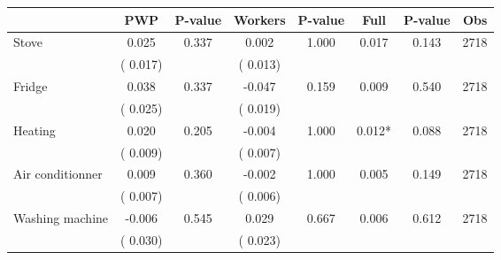 
\begin{tabular}{l*{7}{c}}\hline&\multicolumn{1}{c}{PWP}&\multicolumn{1}{c}{P-value}&\multicolumn{1}{c}{Workers}&\multicolumn{1}{c}{P-value}&\multicolumn{1}{c}{Full}&\multicolumn{1}{c}{P-value}&\multicolumn{1}{c}{Obs} \\ \hline

 Stove       &              0.025       &        0.337  &              0.002       &        1.000  &              0.017       &              0.143 &  2718 \\ 
                       &       (       0.017)             &                               &       (       0.013)                     &                               &                                               &                                &                      \\ 

 Fridge       &              0.038       &        0.337  &             -0.047       &        0.159  &              0.009       &              0.540 &  2718 \\ 
                       &       (       0.025)             &                               &       (       0.019)                     &                               &                                               &                                &                      \\ 

 Heating       &              0.020       &        0.205  &             -0.004       &        1.000  &              0.012*       &              0.088 &  2718 \\ 
                       &       (       0.009)             &                               &       (       0.007)                     &                               &                                               &                                &                      \\ 

 Air conditionner       &              0.009       &        0.360  &             -0.002       &        1.000  &              0.005       &              0.149 &  2718 \\ 
                       &       (       0.007)             &                               &       (       0.006)                     &                               &                                               &                                &                      \\ 

 Washing machine       &             -0.006       &        0.545  &              0.029       &        0.667  &              0.006       &              0.612 &  2718 \\ 
                       &       (       0.030)             &                               &       (       0.023)                     &                               &                                               &                                &                      \\ 


\end{tabular}
